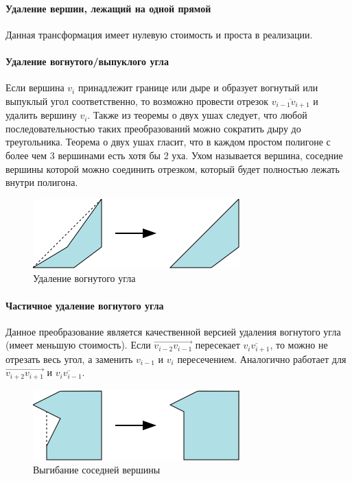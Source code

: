 \documentclass{fefu_thesis/cls/fefu}
\newcommand*\gsegment[1]{\overline{#1}}
\newcommand*\gray[1]{\overrightarrow{#1}}
\begin{document}
    \paragraph{Удаление вершин, лежащий на одной прямой}

    Данная трансформация имеет нулевую стоимость и проста в реализации.

    \paragraph{Удаление вогнутого/выпуклого угла}

    Если вершина $v_i$ принадлежит границе или дыре и образует вогнутый или выпуклый угол соответственно, то возможно провести отрезок $\gsegment{v_{i - 1}v_{i + 1}}$ и удалить вершину $v_i$. Также из теоремы о двух ушах \cite{TwoEars} следует, что любой последовательностью  таких преобразований можно сократить дыру до треугольника. Теорема о двух ушах гласит, что в каждом простом полигоне с более чем 3 вершинами есть хотя бы 2 уха. Ухом называется вершина, соседние вершины которой можно соединить отрезком, который будет полностью лежать внутри полигона.

    \begin{figure}[H]
        \centering
        \includegraphics[scale=1]{images/earcut.png}
        \caption{Удаление вогнутого угла}
    \end{figure}

    \paragraph{Частичное удаление вогнутого угла}

    Данное преобразование является качественной версией удаления вогнутого угла (имеет меньшую стоимость). Если $\gray{v_{i - 2}v_{i - 1}}$ пересекает $\gsegment{v_iv_{i + 1}}$, то можно не отрезать весь угол, а заменить $v_{i - 1}$ и $v_{i}$ пересечением. Аналогично работает для $\gray{v_{i + 2}v_{i + 1}}$ и $\gsegment{v_iv_{i - 1}}$.

    \begin{figure}[H]
        \centering
        \includegraphics[scale=1]{images/bendneighbor.png}
        \caption{Выгибание соседней вершины}
    \end{figure}
\end{document}

